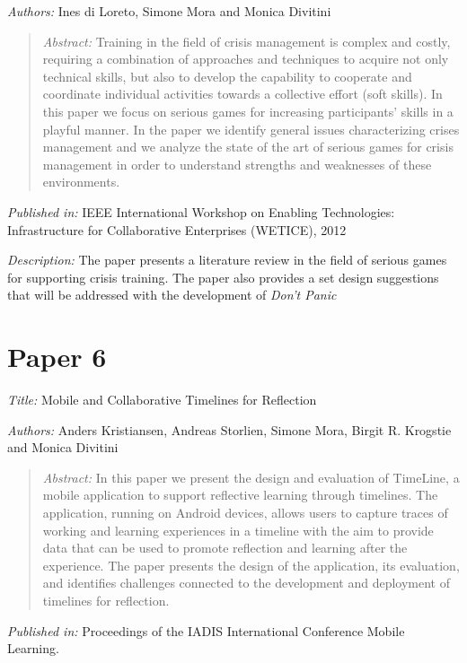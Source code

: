 \emph{Authors: }Ines di Loreto, Simone Mora and Monica Divitini

\begin{quote}
	\emph{Abstract: }Training in the field of crisis management is complex and costly, requiring a combination of approaches and techniques to acquire not only technical skills, but also to develop the capability to cooperate and coordinate individual activities towards a collective effort (soft skills). In this paper we focus on serious games for increasing participants’ skills in a playful manner. In the paper we identify general issues characterizing crises management and we analyze the state of the art of serious games for crisis management in order to understand strengths and weaknesses of these environments.
\end{quote}

\emph{Published in: }IEEE International Workshop on Enabling Technologies: Infrastructure for Collaborative Enterprises (WETICE), 2012

\emph{Description: }The paper presents a literature review in the field of serious games for supporting crisis training. The paper also provides a set design suggestions that will be addressed with the development of \emph{Don't Panic}

\section*{Paper 6}

\emph{Title: }Mobile and Collaborative Timelines for Reflection

\emph{Authors: }Anders Kristiansen, Andreas Storlien, Simone Mora, Birgit R. Krogstie and Monica Divitini

\begin{quote}
	\emph{Abstract: }In this paper we present the design and evaluation of TimeLine, a mobile application to support reflective learning through timelines. The application, running on Android devices, allows users to capture traces of working and learning experiences in a timeline with the aim to provide data that can be used to promote reflection and learning after the experience. The paper presents the design of the application, its evaluation, and identifies challenges connected to the development and deployment of timelines for reflection.
	
\end{quote}

\emph{Published in: }Proceedings of the IADIS International Conference Mobile Learning. 

